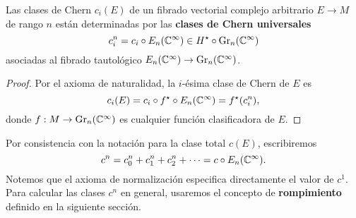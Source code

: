 \begin{proposition}
Las clases de Chern $c_i(E)$ de un fibrado vectorial complejo arbitrario $E \to M$ de rango $n$ están determinadas por las \textbf{clases de Chern universales}
$$c_i^n = c_i \circ E_n(\mathbb C^\infty) \in H^\star \circ \operatorname{Gr}_n(\mathbb C^\infty)$$
asociadas al fibrado tautológico $E_n(\mathbb C^\infty) \to \operatorname{Gr}_n(\mathbb C^\infty)$.
\end{proposition}

\begin{proof}
Por el axioma de naturalidad, la $i$-ésima clase de Chern de $E$ es
$$c_i(E) = c_i \circ f^\star \circ E_n(\mathbb C^\infty) = f^\star(c_i^n),$$
donde $f : M \to \operatorname{Gr}_n(\mathbb C^\infty)$ es cualquier función clasificadora de $E$.
\end{proof}

Por consistencia con la notación para la clase total $c(E)$, escribiremos
$$c^n = c_0^n + c_1^n + c_2^n + \dots = c \circ E_n(\mathbb C^\infty).$$
Notemos que el axioma de normalización especifica directamente el valor de $c^1$. Para calcular las clases $c^n$ en general, usaremos el concepto de \textbf{rompimiento} definido en la siguiente sección.
